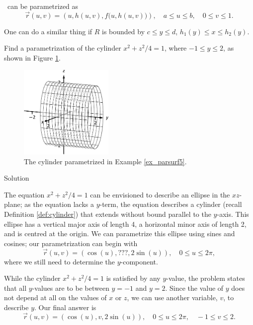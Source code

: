 \surfaceS\ can be parametrized as 
$$\vec r(u,v) = \left( u, h(u,v), f\big(u,h(u,v)\big)\right),\quad a\leq u\leq b,\quad 0\leq v\leq 1.$$

One can do a similar thing if $R$ is bounded by $c\leq y\leq d$, $h_1(y)\leq x\leq h_2(y)$.


\pagebreak
\begin{example}
\label{ex_parsurf5}Find a parametrization of the cylinder $x^2 + z^2/4=1$, where $-1\leq y\leq 2$, as shown in Figure \ref{fig_Vector_Calc_23}. 

\begin{figure}[H]
	\begin{center}
			\includegraphics[width=0.4\textwidth]{fig_Vector_Calc_23}
	\caption{The cylinder parametrized in Example \ref{ex_parsurf5}.}
	\label{fig_Vector_Calc_23}
	\end{center}
\end{figure}

Solution 

The equation $x^2+z^2/4=1$ can be envisioned to describe an ellipse in the $xz$-plane; as the equation lacks a $y$-term, the equation describes a cylinder (recall Definition \ref{def:cylinder}) that extends without bound parallel to the $y$-axis. This ellipse has a vertical major axis of length 4, a horizontal minor axis of length 2, and is centred at the origin. We can parametrize this ellipse using sines and cosines; our parametrization can begin with
$$\vec r(u,v) = \left( \cos (u), \text{???}, 2\sin (u)\right),\quad 0\leq u\leq 2\pi,$$
where we still need to determine the $y$-component.

While the cylinder $x^2+z^2/4=1$ is satisfied by any $y$-value, the problem states that all $y$-values are to be between $y=-1$ and $y=2$. Since the value of $y$ does not depend at all on the values of $x$ or $z$, we can use another variable, $v$, to describe $y$. Our final answer is
$$\vec r(u,v) = \left( \cos (u), v, 2\sin (u)\right), \quad 0\leq u\leq 2\pi,\quad -1\leq v\leq 2.$$
\end{example}



